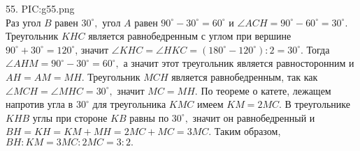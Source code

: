 55. {{PIC:g55.png}}\\
Раз угол $B$ равен $30^\circ,$ угол $A$ равен $90^\circ-30^\circ=60^\circ$ и $\angle ACH=90^\circ-60^\circ=30^\circ.$  Треугольник $KHC$ является равнобедренным с углом при вершине $90^\circ+30^\circ=120^\circ$, значит $\angle KHC=\angle HKC=(180^\circ-120^\circ):2=30^\circ.$ Тогда $\angle AHM=90^\circ-30^\circ=60^\circ,$ а значит этот треугольник является равносторонним и $AH=AM=MH.$ Треугольник $MCH$ является равнобедренным, так как $\angle MCH=\angle MHC=30^\circ,$ значит $MC=MH.$  По теореме о катете, лежащем напротив угла в $30^\circ$ для треугольника $KMC$ имеем $KM=2MC.$ В треугольнике $KHB$ углы при стороне $KB$ равны по $30^\circ,$ значит он равнобедренный и  $BH=KH=KM+MH=2MC+MC=3MC.$ Таким образом, $BH:KM=3MC:2MC=3:2.$\\
